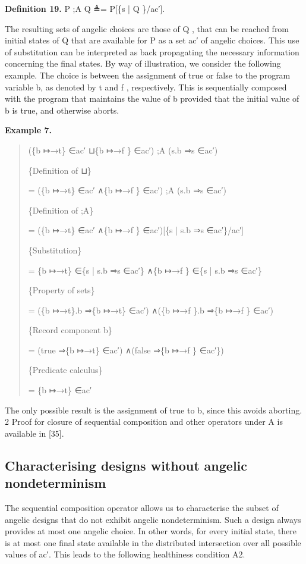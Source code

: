 \documentclass[11pt]{article}
\begin{document}
\noindent\textbf{Definition 19.} P ;A Q ≜= P[\{s | Q \}/ac′].


The resulting sets of angelic choices are those of Q , that can be reached from initial states of Q that are available for P as a set ac′ of angelic choices. This use of substitution can be interpreted as back propagating the necessary information concerning the final states. By way of illustration, we consider the following example. The choice is between the assignment of true or false to the program variable b, as denoted by t and f , respectively. This is sequentially composed with the program that maintains the value of b provided that the initial value of b is true, and otherwise aborts.

\noindent\textbf{Example 7.}


\begin{quote}\small\raggedright
(\{b ↦→t\} ∈ac′ ⊔\{b ↦→f \} ∈ac′) ;A (s.b ⇒s ∈ac′)
\par
\{Definition of ⊔\}
\par
= (\{b ↦→t\} ∈ac′ ∧\{b ↦→f \} ∈ac′) ;A (s.b ⇒s ∈ac′)
\par
\{Definition of ;A\}
\par
= (\{b ↦→t\} ∈ac′ ∧\{b ↦→f \} ∈ac′)[\{s | s.b ⇒s ∈ac′\}/ac′]
\par
\{Substitution\}
\par
= \{b ↦→t\} ∈\{s | s.b ⇒s ∈ac′\} ∧\{b ↦→f \} ∈\{s | s.b ⇒s ∈ac′\}
\par
\{Property of sets\}
\par
= (\{b ↦→t\}.b ⇒\{b ↦→t\} ∈ac′) ∧(\{b ↦→f \}.b ⇒\{b ↦→f \} ∈ac′)
\par
\{Record component b\}
\par
= (true ⇒\{b ↦→t\} ∈ac′) ∧(false ⇒\{b ↦→f \} ∈ac′\})
\par
\{Predicate calculus\}
\par
= \{b ↦→t\} ∈ac′
\end{quote}

The only possible result is the assignment of true to b, since this avoids aborting. 2 Proof for closure of sequential composition and other operators under A is available in [35].

\subsection{Characterising designs without angelic nondeterminism}
The sequential composition operator allows us to characterise the subset of angelic designs that do not exhibit angelic nondeterminism. Such a design always provides at most one angelic choice. In other words, for every initial state, there is at most one final state available in the distributed intersection over all possible values of ac′. This leads to the following healthiness condition A2.
\end{document}
